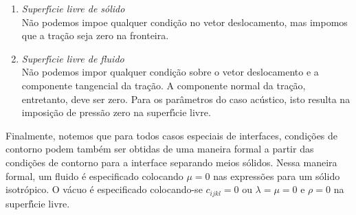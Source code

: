 \begin{enumerate}
\begin{enumerate}
\item \emph{Superf\'\i cie livre de s\'olido} \\
N\~ao podemos impoe qualquer condi\c{c}\~ao no vetor deslocamento, mas
impomos que a tra\c{c}\~ao seja zero na fronteira.
\item \emph{Superf\'\i cie livre de fluido} \\
N\~ao podemos impor qualquer condi\c{c}\~ao sobre o vetor deslocamento e
a componente tangencial da tra\c{c}\~ao. A componente normal da
tra\c{c}\~ao, entretanto, deve ser zero. Para os par\^ametros do caso
ac\'ustico, isto resulta na imposi\c{c}\~ao de press\~ao zero na
superf\'\i cie livre.
\end{enumerate}
\end{enumerate}

Finalmente, notemos que para todos casos especiais de interfaces,
condi\c{c}\~oes de contorno podem tamb\'em ser obtidas de uma maneira
formal a partir das condi\c{c}\~oes de contorno para a interface
separando meios s\'olidos. Nessa maneira formal, um fluido \'e
especificado colocando $\mu=0$ nas express\~oes para um s\'olido
isotr\'opico. O v\'acuo \'e especificado colocando-se $c_{ijkl}=0 $ ou
$\lambda=\mu=0$ e $\rho=0$ na superf\'\i cie livre.

